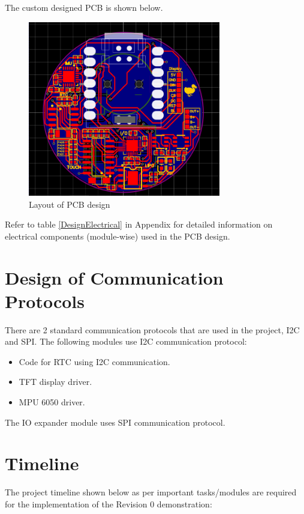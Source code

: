 \documentclass[12pt, titlepage]{article}
\begin{document}
The custom designed PCB is shown below.

\begin{figure}[H]
	\begin{center}
		 \includegraphics[width=0.75\textwidth]{Layout}
		\caption{Layout of PCB design}
		\label{Layout} 
	\end{center}
\end{figure}

Refer to table \ref{DesignElectrical} in Appendix for detailed information on electrical components (module-wise) used in the PCB design.

\section{Design of Communication Protocols}

There are 2 standard communication protocols that are used in the project, I2C and SPI.
The following modules use I2C communication protocol:
\begin{itemize}
\item Code for RTC using I2C communication.
\item TFT display driver.
\item MPU 6050 driver.
\end{itemize}

The IO expander module uses SPI communication protocol.

\section{Timeline}

The project timeline shown below as per important tasks/modules are required for the implementation of the Revision 0 demonstration:
\end{document}
